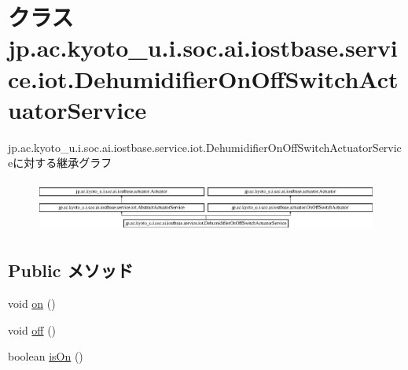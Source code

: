 \hypertarget{classjp_1_1ac_1_1kyoto__u_1_1i_1_1soc_1_1ai_1_1iostbase_1_1service_1_1iot_1_1_dehumidifier_on_off_switch_actuator_service}{\section{クラス jp.\-ac.\-kyoto\-\_\-u.\-i.\-soc.\-ai.\-iostbase.\-service.\-iot.\-Dehumidifier\-On\-Off\-Switch\-Actuator\-Service}
\label{classjp_1_1ac_1_1kyoto__u_1_1i_1_1soc_1_1ai_1_1iostbase_1_1service_1_1iot_1_1_dehumidifier_on_off_switch_actuator_service}
}
jp.\-ac.\-kyoto\-\_\-u.\-i.\-soc.\-ai.\-iostbase.\-service.\-iot.\-Dehumidifier\-On\-Off\-Switch\-Actuator\-Serviceに対する継承グラフ\begin{figure}[H]
\begin{center}
\leavevmode
\includegraphics[height=1.703854cm]{classjp_1_1ac_1_1kyoto__u_1_1i_1_1soc_1_1ai_1_1iostbase_1_1service_1_1iot_1_1_dehumidifier_on_off_switch_actuator_service}
\end{center}
\end{figure}
\subsection*{Public メソッド}
\begin{DoxyCompactItemize}
\item 
void \hyperlink{classjp_1_1ac_1_1kyoto__u_1_1i_1_1soc_1_1ai_1_1iostbase_1_1service_1_1iot_1_1_dehumidifier_on_off_switch_actuator_service_ae56ec8fd9a6ba6a1563b464abe031109}{on} ()
\item 
void \hyperlink{classjp_1_1ac_1_1kyoto__u_1_1i_1_1soc_1_1ai_1_1iostbase_1_1service_1_1iot_1_1_dehumidifier_on_off_switch_actuator_service_a994b3065ac1705a3ec34429fa91568de}{off} ()
\item 
boolean \hyperlink{classjp_1_1ac_1_1kyoto__u_1_1i_1_1soc_1_1ai_1_1iostbase_1_1service_1_1iot_1_1_dehumidifier_on_off_switch_actuator_service_a3b7e0dfb4cfbebabd07ff0dadfdf610c}{is\-On} ()
\end{DoxyCompactItemize}


